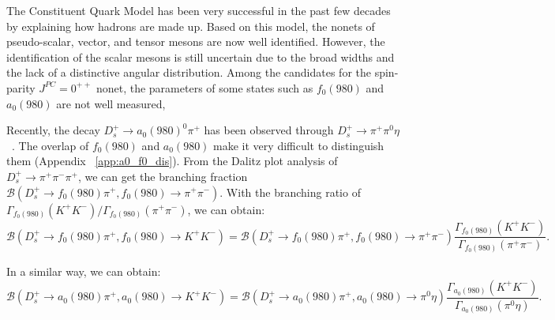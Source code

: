 \par{
    The Constituent Quark Model has been very successful in the past few decades by explaining how hadrons are made up.
    Based on this model, the nonets of pseudo-scalar, vector, and tensor mesons are now well identified.
    However, the identification of the scalar mesons is still uncertain due to the broad widths and the lack of a distinctive angular distribution.
    Among the candidates for the spin-parity $J^{PC}=0^{++}$ nonet, the parameters of some states such as $f_{0}(980)$ and $a_{0}(980)$ are not well measured,
    
    
    
    Recently, the decay $D_{s}^{+} \rightarrow a_{0}(980)^{0}\pi^{+}$ has been observed through $D_{s}^{+} \rightarrow \pi^{+}\pi^{0}\eta$~\cite{Doc-DB-682-v7}.
    The overlap of $f_{0}(980)$ and $a_{0}(980)$ make it very difficult to distinguish them (Appendix ~\ref{app:a0_f0_dis}).
    From the Dalitz plot analysis of $D_{s}^{+} \rightarrow \pi^{+}\pi^{-}\pi^{+}$, we can get the branching fraction $\mathcal{B}(D_{s}^{+} \rightarrow f_{0}(980)\pi^{+}, f_{0}(980) \rightarrow \pi^{+}\pi^{-})$.
    With the branching ratio of $\Gamma_{f_{0}(980)}(K^{+}K^{-})/\Gamma_{f_{0}(980)}(\pi^{+}\pi^{-})$, we can obtain:
    \begin{equation}
            \mathcal{B}(D_{s}^{+} \rightarrow f_{0}(980)\pi^{+}, f_{0}(980) \rightarrow K^{+}K^{-}) =\mathcal{B}(D_{s}^{+} \rightarrow f_{0}(980)\pi^{+}, f_{0}(980) \rightarrow \pi^{+}\pi^{-})  \frac{\Gamma_{f_{0}(980)}(K^{+}K^{-})}{ \Gamma_{f_{0}(980)}(\pi^{+}\pi^{-})}. \label{bf-f0}
    \end{equation}
    
    In a similar way, we can obtain:
    \begin{equation}
            \mathcal{B}(D_{s}^{+} \rightarrow a_{0}(980)\pi^{+}, a_{0}(980) \rightarrow K^{+}K^{-}) =\mathcal{B}(D_{s}^{+} \rightarrow a_{0}(980)\pi^{+}, a_{0}(980) \rightarrow \pi^{0}\eta)  \frac{\Gamma_{a_{0}(980)}(K^{+}K^{-})}{ \Gamma_{a_{0}(980)}(\pi^{0}\eta)}. \label{bf-a0} 
    \end{equation}
    
}
